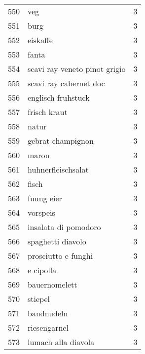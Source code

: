 \begin{tabular}{llr}
550  &                                                veg &      3 \\
551  &                                               burg &      3 \\
552  &                                           eiskaffe &      3 \\
553  &                                              fanta &      3 \\
554  &                      scavi ray veneto pinot grigio &      3 \\
555  &                             scavi ray cabernet doc &      3 \\
556  &                                 englisch fruhstuck &      3 \\
557  &                                       frisch kraut &      3 \\
558  &                                              natur &      3 \\
559  &                                  gebrat champignon &      3 \\
560  &                                              maron &      3 \\
561  &                                 huhnerfleischsalat &      3 \\
562  &                                              fisch &      3 \\
563  &                                         fuung eier &      3 \\
564  &                                           vorspeis &      3 \\
565  &                               insalata di pomodoro &      3 \\
566  &                                  spaghetti diavolo &      3 \\
567  &                                prosciutto e funghi &      3 \\
568  &                                          e cipolla &      3 \\
569  &                                      bauernomelett &      3 \\
570  &                                            stiepel &      3 \\
571  &                                         bandnudeln &      3 \\
572  &                                       riesengarnel &      3 \\
573  &                                lumach alla diavola &      3 \\

\end{tabular}
